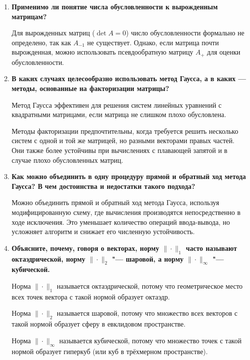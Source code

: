 \documentclass[12pt, a4paper]{article}
\begin{document}
\begin{enumerate}
	\item \textbf{Применимо ли понятие числа обусловленности к вырожденным матрицам?}
	
		Для вырожденных матриц ($\det A = 0$) число обусловленности формально не определено, так как $A_{-1}$
		не существует. Однако, если матрица почти вырожденная, можно использовать псевдообратную матрицу $A_{+}$
		для оценки обусловленности.
	\item \textbf{В каких случаях целесообразно использовать метод Гаусса,
	а в каких — методы, основанные на факторизации матрицы?}
	
		Метод Гаусса эффективен для решения систем линейных уравнений с квадратными матрицами, если матрица не слишком плохо обусловлена.
		
		Методы факторизации предпочтительны, когда требуется решить несколько систем с одной и той же матрицей, но разными векторами правых частей. Они также более устойчивы при вычислениях с плавающей запятой и в случае плохо обусловленных матриц.
	
	\item \textbf{Как можно объединить в одну процедуру прямой и обратный ход метода Гаусса? В чем достоинства и недостатки такого подхода?}
	
		Можно объединить прямой и обратный ход метода Гаусса, используя модифицированную схему, где вычисления производятся непосредственно в ходе исключения. Это уменьшает количество операций ввода-вывода, но усложняет алгоритм и снижает его численную устойчивость.
	
	\item \textbf{Объясните, почему, говоря о векторах, норму $\| \cdot \|_1$ часто
	называют октаэдрической, норму  $\| \cdot \|_2$ "--- шаровой, а норму
	 $\| \cdot \|_{\infty}$ "--- кубической.}
	 
	 	Норма $\|\cdot\|_1$ называется октаэдрической, потому что геометрическое место всех точек вектора с такой нормой образует октаэдр.
	 	
	 	Норма $\|\cdot\|_2$ называется шаровой, потому что множество всех векторов с такой нормой образует сферу в евклидовом пространстве.
	 	
	 	Норма $\|\cdot\|_{\infty}$ называется кубической, потому что множество точек с такой нормой образует гиперкуб (или куб в трёхмерном пространстве).
	 
	\end{enumerate}
\end{document}
